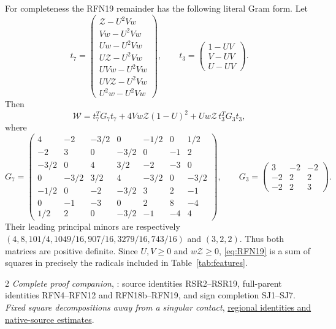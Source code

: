 \documentclass[10pt]{article}
\newcommand{\W}{\mathcal W}
\newcommand{\Zc}{\mathcal Z}
\begin{document}
For completeness the RFN19 remainder has the following literal Gram form.
Let
\[
 t_7=\begin{pmatrix}
 \Zc-U^2Vw\\Vw-U^2Vw\\Uw-U^2Vw\\U\Zc-U^2Vw\\
 UVw-U^2Vw\\UV\Zc-U^2Vw\\U^2w-U^2Vw
 \end{pmatrix},\qquad
 t_3=\begin{pmatrix}1-UV\\V-UV\\U-UV\end{pmatrix}.
\]
Then
\begin{equation}
 \W=t_7^TG_7t_7+4Vw\Zc(1-U)^2+Uw\Zc\,t_3^TG_3t_3,
 \label{eq:RFN19}
\end{equation}
where
\[
 G_7=\begin{pmatrix}
4&-2&-3/2&0&-1/2&0&1/2\\
-2&3&0&-3/2&0&-1&2\\
-3/2&0&4&3/2&-2&-3&0\\
0&-3/2&3/2&4&-3/2&0&-3/2\\
-1/2&0&-2&-3/2&3&2&-1\\
0&-1&-3&0&2&8&-4\\
1/2&2&0&-3/2&-1&-4&4
\end{pmatrix},\qquad
 G_3=\begin{pmatrix}3&-2&-2\\-2&2&2\\-2&2&3\end{pmatrix}.
\]
Their leading principal minors are respectively
$(4,8,101/4,1049/16,907/16,3279/16,743/16)$ and $(3,2,2)$.
Thus both matrices are positive definite. Since $U,V\geq0$ and
$w\Zc\geq0$, \eqref{eq:RFN19} is a sum of squares in precisely the
radicals included in Table~\ref{tab:features}.

\begin{thebibliography}{2}
\emph{Complete proof companion}, :
source identities RSR2--RSR19, full-parent identities RFN4--RFN12 and
RFN18b--RFN19, and sign completion SJ1--SJ7.
\emph{Fixed square decompositions away from a singular contact},
\href{../fixed-c2-gates/Fixed_C2_Completions.pdf}{regional identities
and native-source estimates}.
\end{thebibliography}
\end{document}
